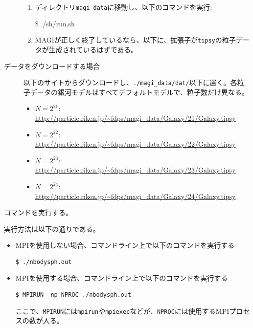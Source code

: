 \begin{description}
\begin{enumerate}
\item ディレクトリ\texttt{magi\_data}に移動し、以下のコマンドを実行:
\begin{screen}
\$ ./sh/run.sh
\end{screen}
\item \textsc{MAGI}が正しく終了しているなら、以下に、拡張子が\texttt{tipsy}の粒子データが生成されているはずである。
\end{enumerate}
\item[データをダウンロードする場合]  以下のサイトからダウンロードし、\texttt{./magi\_data/dat/}以下に置く。各粒子データの銀河モデルはすべてデフォルトモデルで、粒子数だけ異なる。
\begin{itemize}
\item $N=2^{21}$: \href{http://particle.riken.jp/~fdps/magi_data/Galaxy/21/Galaxy.tipsy}{http://particle.riken.jp{\slash}\~{}fdps{\slash}magi\_data{\slash}Galaxy{\slash}21{\slash}Galaxy.tipsy}
\item $N=2^{22}$: \href{http://particle.riken.jp/~fdps/magi_data/Galaxy/22/Galaxy.tipsy}{http://particle.riken.jp{\slash}\~{}fdps{\slash}magi\_data{\slash}Galaxy{\slash}22{\slash}Galaxy.tipsy}
\item $N=2^{23}$: \href{http://particle.riken.jp/~fdps/magi_data/Galaxy/23/Galaxy.tipsy}{http://particle.riken.jp{\slash}\~{}fdps{\slash}magi\_data{\slash}Galaxy{\slash}23{\slash}Galaxy.tipsy}
\item $N=2^{24}$: \href{http://particle.riken.jp/~fdps/magi_data/Galaxy/23/Galaxy.tipsy}{http://particle.riken.jp{\slash}\~{}fdps{\slash}magi\_data{\slash}Galaxy{\slash}24{\slash}Galaxy.tipsy}
\end{itemize}
\end{description}

\label{s3sec:NbodySPH_make}
コマンドを実行する。

\label{s3sec:NbodySPH_execution}
実行方法は以下の通りである。
\begin{itemize}
\item MPIを使用しない場合、コマンドライン上で以下のコマンドを実行する
\begin{screen}
\begin{verbatim}
$ ./nbodysph.out
\end{verbatim}
\end{screen}
  
\item MPIを使用する場合、コマンドライン上で以下のコマンドを実行する
\begin{screen}
\begin{verbatim}
$ MPIRUN -np NPROC ./nbodysph.out
\end{verbatim}
\end{screen}
ここで、\texttt{MPIRUN}には\texttt{mpirun}や\texttt{mpiexec}などが、\texttt{NPROC}には使用するMPIプロセスの数が入る。
\end{itemize}

